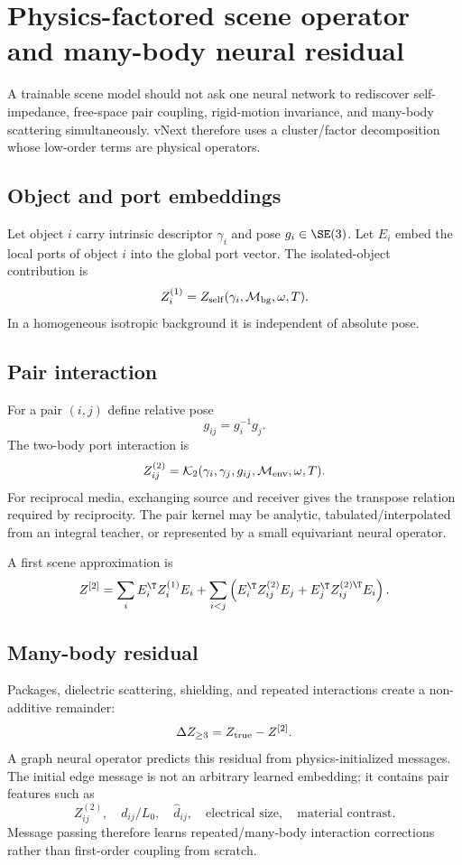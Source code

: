\section{Physics-factored scene operator and many-body neural residual}
\label{sec:physics-factored}

A trainable scene model should not ask one neural network to rediscover
self-impedance, free-space pair coupling, rigid-motion invariance, and
many-body scattering simultaneously. vNext therefore uses a cluster/factor
decomposition whose low-order terms are physical operators.

\subsection{Object and port embeddings}

Let object $i$ carry intrinsic descriptor $\gamma_i$ and pose $g_i\in\SE(3)$.
Let $E_i$ embed the local ports of object $i$ into the global port vector.
The isolated-object contribution is
\[
  Z_i^{(1)}
  =
  Z_{\rm self}(\gamma_i,\mathcal M_{\rm bg},\omega,T).
\]
In a homogeneous isotropic background it is independent of absolute pose.

\subsection{Pair interaction}

For a pair $(i,j)$ define relative pose
\[
  g_{ij}=g_i^{-1}g_j.
\]
The two-body port interaction is
\[
  Z_{ij}^{(2)}
  =
  \mathcal K_2(
    \gamma_i,\gamma_j,g_{ij},
    \mathcal M_{\rm env},\omega,T
  ).
\]
For reciprocal media, exchanging source and receiver gives the transpose
relation required by reciprocity. The pair kernel may be analytic,
tabulated/interpolated from an integral teacher, or represented by a small
equivariant neural operator.

A first scene approximation is
\[
 Z^{[2]}
 =
 \sum_i E_i^\T Z_i^{(1)}E_i
 +\sum_{i<j}
 \left(
   E_i^\T Z_{ij}^{(2)}E_j
  +E_j^\T Z_{ij}^{(2)\T}E_i
 \right).
 \label{eq:pair-expansion}
\]

\subsection{Many-body residual}

Packages, dielectric scattering, shielding, and repeated interactions create a
non-additive remainder:
\[
  \Delta Z_{\ge3}
  =
  Z_{\rm true}-Z^{[2]}.
\]
A graph neural operator predicts this residual from physics-initialized
messages. The initial edge message is not an arbitrary learned embedding; it
contains pair features such as
\[
  Z_{ij}^{(2)},\quad
  d_{ij}/L_0,\quad
  \widehat d_{ij},\quad
  \text{electrical size},\quad
  \text{material contrast}.
\]
Message passing therefore learns repeated/many-body interaction corrections
rather than first-order coupling from scratch.

